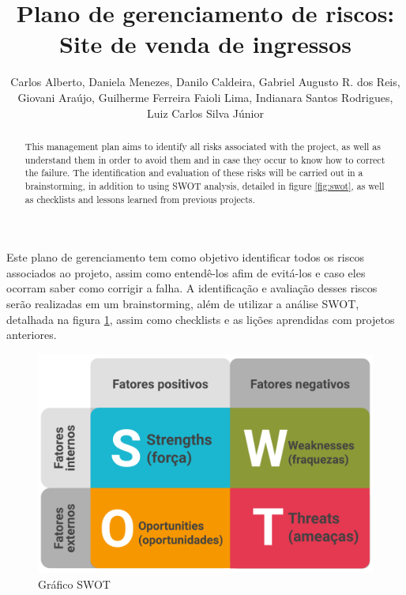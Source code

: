 \documentclass[12pt]{article}
\title{Plano de gerenciamento de riscos:\\Site de venda de ingressos}
\author{
    \begin{minipage}{\textwidth}
        Carlos Alberto\inst{1},
        Daniela Menezes\inst{1},
        Danilo Caldeira\inst{1},
        Gabriel Augusto R. dos Reis\inst{1},
        Giovani Araújo\inst{1},
        Guilherme Ferreira Faioli Lima\inst{1},
        Indianara Santos Rodrigues\inst{1},
        Luiz Carlos Silva Júnior\inst{1}
    \end{minipage}
}
\begin{document}
    \maketitle

    \begin{resumo}
        Este plano de gerenciamento tem como objetivo identificar todos os riscos associados ao projeto, assim como entendê-los afim de evitá-los e caso eles ocorram saber como corrigir a falha. A identificação e avaliação desses riscos serão realizadas em um brainstorming, além de utilizar a análise SWOT, detalhada na figura \ref{fig:swot}, assim como checklists e as lições aprendidas com projetos anteriores.
    \end{resumo}

    \begin{abstract}
        This management plan aims to identify all risks associated with the project, as well as understand them in order to avoid them and in case they occur to know how to correct the failure. The identification and evaluation of these risks will be carried out in a brainstorming, in addition to using SWOT analysis, detailed in figure \ref{fig:swot}, as well as checklists and lessons learned from previous projects.
    \end{abstract}

    \begin{figure}[ht]
        \centering
        \includegraphics[scale=0.3]{./Images/swot.png}
        \caption{Gráfico SWOT}
        \label{fig:swot}
    \end{figure}
\end{document}
